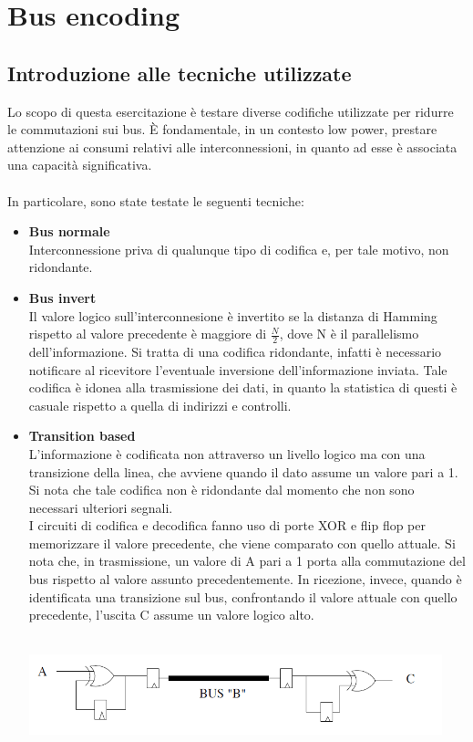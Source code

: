 \documentclass[11pt,  english, makeidx, a4paper, titlepage, oneside]{book}
\begin{document}
\chapter{Bus encoding}
\section{Introduzione alle tecniche utilizzate}
Lo scopo di questa esercitazione è testare diverse codifiche utilizzate per ridurre le commutazioni sui bus. È fondamentale, in un contesto low power, prestare attenzione ai consumi relativi alle interconnessioni, in quanto ad esse è associata una capacità significativa.
\\\\
In particolare, sono state testate le seguenti tecniche:
\begin{itemize}
\item \textbf{Bus normale}
\\
Interconnessione priva di qualunque tipo di codifica e, per tale motivo, non ridondante.
\item \textbf{Bus invert}
\\
Il valore logico sull'interconnesione è invertito se la distanza di Hamming rispetto al valore precedente è maggiore di $\frac{N}{2}$, dove N è il parallelismo dell'informazione. Si tratta di una codifica ridondante, infatti è necessario notificare al ricevitore l'eventuale inversione dell'informazione inviata.
Tale codifica è idonea alla trasmissione dei dati, in quanto la statistica di questi è casuale rispetto a quella di indirizzi e controlli.
\item \textbf{Transition based}
\\
L'informazione è codificata non attraverso un livello logico ma con una transizione della linea, che avviene quando il dato assume un valore pari a 1. Si nota che tale codifica non è ridondante dal momento che non sono necessari ulteriori segnali.
\\
I circuiti di codifica e decodifica fanno uso di porte XOR e flip flop per memorizzare il valore precedente, che viene comparato con quello attuale. Si nota che, in trasmissione, un valore di A pari a 1 porta alla commutazione del bus rispetto al valore assunto precedentemente. In ricezione, invece, quando è identificata una transizione sul bus, confrontando il valore attuale con quello precedente, l'uscita C assume un valore logico alto.
\\\\
\centerline{\includegraphics[width=12cm]{./img/Lab_4/tran_based.png}}

\end{itemize}
\end{document}
